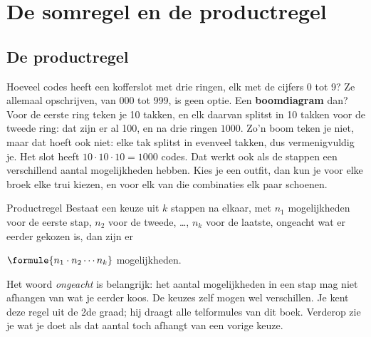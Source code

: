 

\section{De somregel en de productregel}

\subsection{De productregel}

Hoeveel codes heeft een kofferslot met drie ringen, elk met de cijfers 0 tot 9? Ze allemaal opschrijven, van 000 tot 999, is geen optie. Een \textbf{boomdiagram} dan? Voor de eerste ring teken je 10 takken, en elk daarvan splitst in 10 takken voor de tweede ring: dat zijn er al 100, en na drie ringen $1000$. Zo'n boom teken je niet, maar dat hoeft ook niet: elke tak splitst in evenveel takken, dus vermenigvuldig je. Het slot heeft $10 \cdot 10 \cdot 10 = 1000$ codes. Dat werkt ook als de stappen een verschillend aantal mogelijkheden hebben. Kies je een outfit, dan kun je voor elke broek elke trui kiezen, en voor elk van die combinaties elk paar schoenen.

\begin{theorie}
\begin{stelling}{Productregel}
Bestaat een keuze uit $k$ stappen na elkaar, met $n_1$ mogelijkheden voor de eerste stap, $n_2$ voor de tweede, \ldots, $n_k$ voor de laatste, ongeacht wat er eerder gekozen is, dan zijn er

\vspace{1mm}
\qquad $\formule{n_1 \cdot n_2 \cdots n_k}$ \quad mogelijkheden.
\end{stelling}
\end{theorie}

Het woord \textit{ongeacht} is belangrijk: het aantal mogelijkheden in een stap mag niet afhangen van wat je eerder koos. De keuzes zelf mogen wel verschillen. Je kent deze regel uit de 2de graad; hij draagt alle telformules van dit boek. Verderop zie je wat je doet als dat aantal toch afhangt van een vorige keuze.

